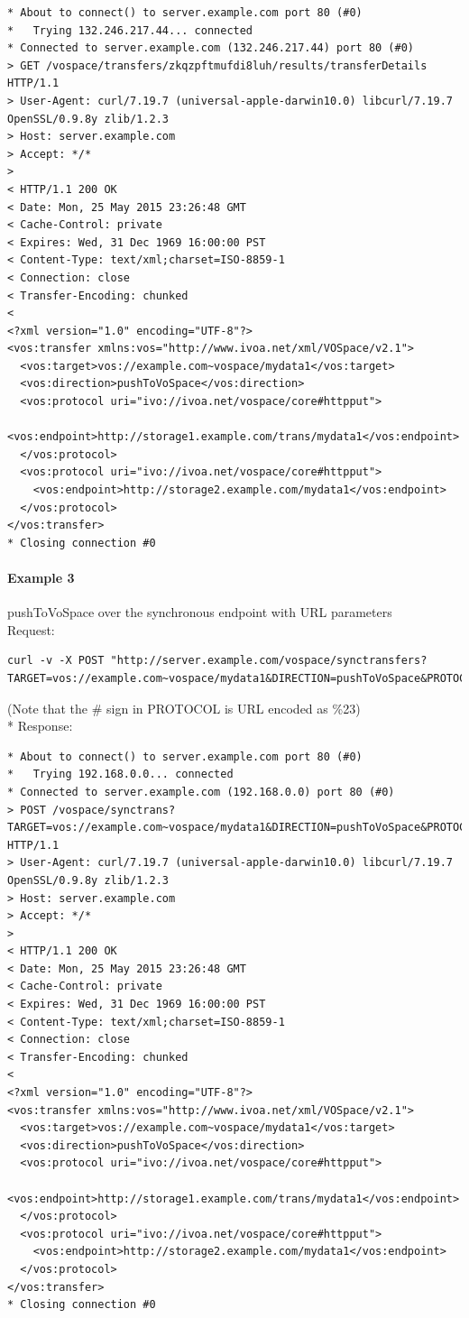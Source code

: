 \documentclass[11pt,a4paper]{ivoa}
\begin{document}
\begin{lstlisting}
* About to connect() to server.example.com port 80 (#0)
*   Trying 132.246.217.44... connected
* Connected to server.example.com (132.246.217.44) port 80 (#0)
> GET /vospace/transfers/zkqzpftmufdi8luh/results/transferDetails HTTP/1.1
> User-Agent: curl/7.19.7 (universal-apple-darwin10.0) libcurl/7.19.7 OpenSSL/0.9.8y zlib/1.2.3
> Host: server.example.com
> Accept: */*
>
< HTTP/1.1 200 OK
< Date: Mon, 25 May 2015 23:26:48 GMT
< Cache-Control: private
< Expires: Wed, 31 Dec 1969 16:00:00 PST
< Content-Type: text/xml;charset=ISO-8859-1
< Connection: close
< Transfer-Encoding: chunked
<
<?xml version="1.0" encoding="UTF-8"?>
<vos:transfer xmlns:vos="http://www.ivoa.net/xml/VOSpace/v2.1">
  <vos:target>vos://example.com~vospace/mydata1</vos:target>
  <vos:direction>pushToVoSpace</vos:direction>
  <vos:protocol uri="ivo://ivoa.net/vospace/core#httpput">
    <vos:endpoint>http://storage1.example.com/trans/mydata1</vos:endpoint>
  </vos:protocol>
  <vos:protocol uri="ivo://ivoa.net/vospace/core#httpput">
    <vos:endpoint>http://storage2.example.com/mydata1</vos:endpoint>
  </vos:protocol>
</vos:transfer>
* Closing connection #0
\end{lstlisting}

\paragraph{Example 3}
pushToVoSpace over the synchronous endpoint with URL parameters
\\[5px]
\noindent
Request:
\begin{lstlisting}
curl -v -X POST "http://server.example.com/vospace/synctransfers?TARGET=vos://example.com~vospace/mydata1&DIRECTION=pushToVoSpace&PROTOCOL=ivo://ivoa.net/vospace/core%23httpput"
\end{lstlisting}
(Note that the \# sign in PROTOCOL is URL encoded as \%23) \\*
Response:
\begin{lstlisting}
* About to connect() to server.example.com port 80 (#0)
*   Trying 192.168.0.0... connected
* Connected to server.example.com (192.168.0.0) port 80 (#0)
> POST /vospace/synctrans?TARGET=vos://example.com~vospace/mydata1&DIRECTION=pushToVoSpace&PROTOCOL=ivo://ivoa.net/vospace/core\%23httpput HTTP/1.1
> User-Agent: curl/7.19.7 (universal-apple-darwin10.0) libcurl/7.19.7 OpenSSL/0.9.8y zlib/1.2.3
> Host: server.example.com
> Accept: */*
>
< HTTP/1.1 200 OK
< Date: Mon, 25 May 2015 23:26:48 GMT
< Cache-Control: private
< Expires: Wed, 31 Dec 1969 16:00:00 PST
< Content-Type: text/xml;charset=ISO-8859-1
< Connection: close
< Transfer-Encoding: chunked
<
<?xml version="1.0" encoding="UTF-8"?>
<vos:transfer xmlns:vos="http://www.ivoa.net/xml/VOSpace/v2.1">
  <vos:target>vos://example.com~vospace/mydata1</vos:target>
  <vos:direction>pushToVoSpace</vos:direction>
  <vos:protocol uri="ivo://ivoa.net/vospace/core#httpput">
    <vos:endpoint>http://storage1.example.com/trans/mydata1</vos:endpoint>
  </vos:protocol>
  <vos:protocol uri="ivo://ivoa.net/vospace/core#httpput">
    <vos:endpoint>http://storage2.example.com/mydata1</vos:endpoint>
  </vos:protocol>
</vos:transfer>
* Closing connection #0
\end{lstlisting}
\end{document}
